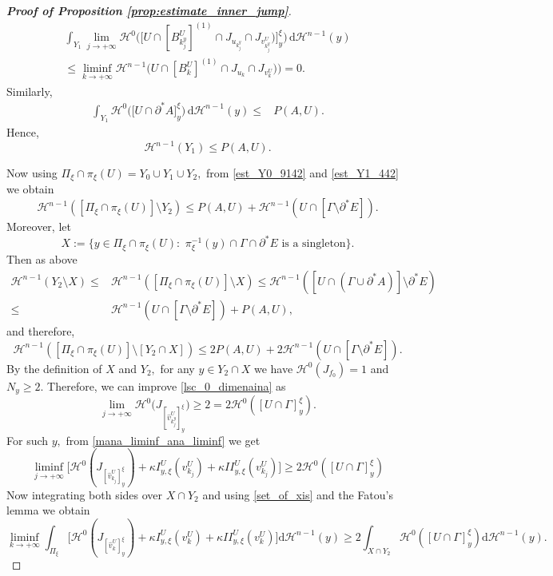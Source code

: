 \documentclass[reqno]{amsart}
\numberwithin{equation}{section}
\theoremstyle{plain}
\theoremstyle{definition}
\newcommand{\cH}{\mathcal{H}}
\newcommand{\p}{\partial}
\renewcommand{\d}{\mathrm{d}}
\renewcommand{\hat}{\widehat}
\begin{document}
\begin{proof}[\textbf{Proof of Proposition \ref{prop:estimate_inner_jump}}]
\begin{multline*}
\int_{Y_1} \lim\limits_{j\to+\infty} \cH^0\Big(\Big[U\cap [B_{k_j^y}^U]^{(1)}\cap J_{u_{k_j^y}}\cap J_{v_{k_j^y}^U})\Big]_y^\xi\Big) \,\d\cH^{n-1}(y)\\
\le  \liminf\limits_{k\to+\infty} \cH^{n-1}\Big(U\cap [B_k^U]^{(1)} \cap J_{u_k}\cap J_{v_k^U})\Big)=0.
\end{multline*}
Similarly, 
\begin{align*}
\int_{Y_1} \cH^0\Big(\Big[U\cap\p^*A\Big]_y^\xi \Big)\, \d\cH^{n-1}(y) 
\le & P(A,U).
\end{align*}
Hence,
\begin{equation}\label{est_Y1_442}
\cH^{n-1}(Y_1) \le P(A,U).
\end{equation}

Now using $\Pi_\xi\cap \pi_\xi(U) = Y_0\cup Y_1\cup Y_2,$ from \eqref{est_Y0_9142} and \eqref{est_Y1_442} we obtain
$$
\cH^{n-1}([\Pi_\xi\cap \pi_\xi(U)]\setminus Y_2) \le P(A,U) + \cH^{n-1}(U \cap [\Gamma\setminus \p^*E]).
$$
Moreover, let 
$$
X:=\{y\in \Pi_\xi\cap \pi_\xi(U):\,\,\text{$\pi_\xi^{-1}(y)\cap \Gamma\cap \p^*E$ is a singleton}\}.
$$
Then as above 
\begin{align*}
\cH^{n-1}(Y_2\setminus X) \le & \cH^{n-1}([\Pi_\xi\cap \pi_\xi(U)]\setminus X )\le \cH^{n-1}([U\cap (\Gamma\cup \p^*A)]\setminus \p^*E) \\
\le &
\cH^{n-1}(U \cap [\Gamma\setminus \p^*E]) + P(A,U),
\end{align*}
and therefore, 
\begin{equation}\label{yahudlar7465}
\cH^{n-1}([\Pi_\xi\cap \pi_\xi(U)] \setminus [Y_2\cap X ]) \le 2P(A,U) + 2\cH^{n-1}(U \cap [\Gamma\setminus \p^*E]).
\end{equation}
By the definition of $X $ and $Y_2,$ for any $y\in Y_2\cap X$ we have $\cH^0(J_{f_0})=1$ and $N_y\ge2.$ Therefore,
we can improve \eqref{lsc_0_dimenaina} as 
\begin{equation*}
\lim\limits_{j\to+\infty} \cH^0\Big(J_{[\hat v_{k_j^y}^U]_y^\xi}\Big) \ge  2= 2\cH^0([U\cap \Gamma]_y^\xi).
\end{equation*}
For such $y,$ from  \eqref{mana_liminf_ana_liminf}  we get
$$
\liminf\limits_{j\to+\infty} \Big[\cH^0(J_{[\hat v_{k_j}^U]_y^\xi}) + \kappa I_{y,\xi}^U(v_{k_j}^U) + \kappa II_{y,\xi}^U(v_{k_j}^U) \Big] \ge 
2\cH^0([U\cap \Gamma]_y^\xi)
$$
Now integrating both sides  over $X \cap Y_2$ and using \eqref{set_of_xis} and the Fatou's lemma we obtain
$$ 
\liminf\limits_{k\to+\infty} \int_{\Pi_\xi} \Big[\cH^0(J_{[\hat v_k^U]_y^\xi}) + \kappa I_{y,\xi}^U(v_k^U) + \kappa II_{y,\xi}^U(v_{k}^U) \Big]\d\cH^{n-1}(y) \ge 2\int_{X \cap Y_2}\cH^0([U\cap \Gamma]_y^\xi)\d\cH^{n-1}(y).
$$
\end{proof}
\end{document}
